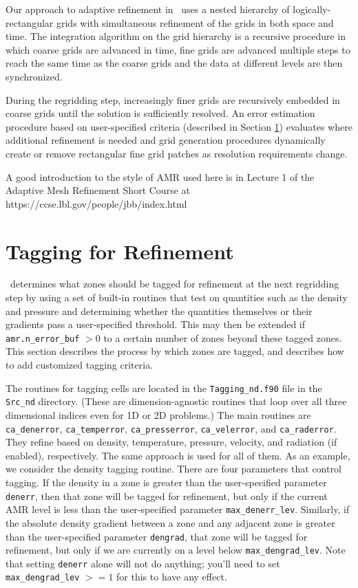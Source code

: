 Our approach to adaptive refinement in \castro\ uses a nested hierarchy
of logically-rectangular grids with simultaneous refinement of the
grids in both space and time.  The integration algorithm on the grid
hierarchy is a recursive procedure in which coarse grids are advanced
in time, fine grids are advanced multiple steps to reach the same time
as the coarse grids and the data at different levels are then
synchronized.

During the regridding step, increasingly finer grids
are recursively embedded in coarse grids until the solution is
sufficiently resolved.  An error estimation procedure based on
user-specified criteria (described in Section \ref{sec:tagging}) 
evaluates where additional refinement is needed
and grid generation procedures dynamically create or
remove rectangular fine grid patches as resolution requirements change.

A good introduction to the style of AMR used here is in Lecture 1
of the Adaptive Mesh Refinement Short Course at
https://ccse.lbl.gov/people/jbb/index.html

\section{Tagging for Refinement}
\label{sec:tagging}

\castro\ determines what zones should be tagged for refinement at the
next regridding step by using a set of built-in routines that test on
quantities such as the density and pressure and determining whether
the quantities themselves or their gradients pass a user-specified
threshold.  This may then be extended if {\tt amr.n\_error\_buf} $> 0$
to a certain number of zones beyond these tagged zones. This section
describes the process by which zones are tagged, and describes how to
add customized tagging criteria.

The routines for tagging cells are located in the {\tt Tagging\_nd.f90} file 
in the {\tt Src\_nd} directory. (These are dimension-agnostic routines that loop 
over all three dimensional indices even for 1D or 2D problems.) The main routines are 
{\tt ca\_denerror}, {\tt ca\_temperror}, {\tt ca\_presserror}, {\tt ca\_velerror}, 
and {\tt ca\_raderror}. They refine based on density, temperature, pressure, 
velocity, and radiation (if enabled), respectively. The same approach is used 
for all of them. As an example, we consider the density tagging routine. There 
are four parameters that control tagging. If the density in a zone is greater than 
the user-specified parameter {\tt denerr}, then that zone will be tagged 
for refinement, but only if the current AMR level is less than the 
user-specified parameter {\tt max\_denerr\_lev}. Similarly, 
if the absolute density gradient between a zone and any adjacent zone 
is greater than the user-specified parameter {\tt dengrad}, that zone 
will be tagged for refinement, but only if we are currently on a level 
below {\tt max\_dengrad\_lev}. Note that setting {\tt denerr} alone will 
not do anything; you'll need to set {\tt max\_dengrad\_lev} $>= 1$ for
this to have any effect.

